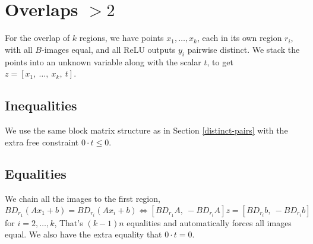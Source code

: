 \documentclass{article}
\begin{document}
\section{Overlaps $>2$}
For the overlap of $k$ regions, we have points $x_1,\dots,x_k$, each in its own region $r_i$, with all $B$-images equal, and all ReLU outputs $y_i$ pairwise distinct. We stack the points into an unknown variable along with the scalar $t$, to get $z=[x_1,\ \dots, \ x_k,\ t]$. 
\subsection*{Inequalities}
We use the same block matrix structure as in Section \ref{distinct-pairs} with the extra free constraint $0\cdot t \le 0$.
\subsection*{Equalities}
We chain all the images to the first region, 
$$
BD_{r_1}(Ax_1 +b)=BD_{r_i}(Ax_i+b) \iff \left[BD_{r_1}A,\ -BD_{r_i}A\right]z = \left[BD_{r_i}b,\ - BD_{r_i}b\right] 
$$
for $i=2,\dots,k$, That's $(k-1)n$ equalities and automatically forces all images equal. We also have the extra equality that $0\cdot t =0$.
\end{document}
